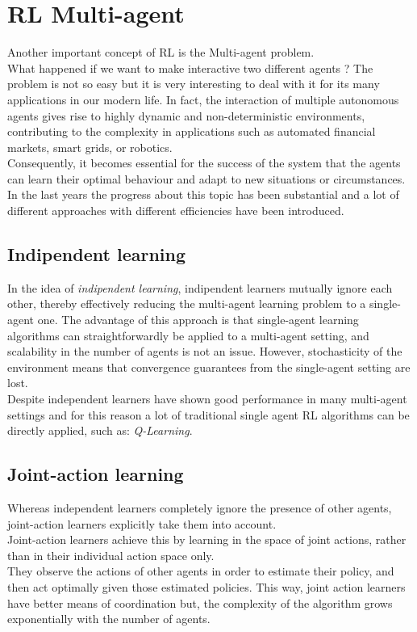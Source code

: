 \documentclass[]{report}
\begin{document}
\section{ RL Multi-agent }
Another important concept of RL is the Multi-agent problem.\\
What happened if we want to make interactive two different agents ? The problem is not so easy but it is very interesting to deal with it for its many applications in our modern life.
In fact, the interaction of multiple autonomous agents gives rise to highly dynamic and non-deterministic environments, contributing to the complexity in applications such as automated financial markets, smart grids, or robotics.\\
Consequently, it becomes essential for the success of the system that the agents can learn their optimal behaviour and adapt to new situations or circumstances.\\
In the last years the progress about this topic has been substantial and a lot of different approaches with different efficiencies have been introduced.

\subsection{Indipendent learning}
In the idea of \emph{indipendent learning}, indipendent learners mutually  ignore  each  other, thereby  effectively reducing  the  multi-agent learning problem to a single-agent one.
The advantage of this approach is that single-agent learning algorithms can straightforwardly be applied to a multi-agent setting, and scalability in the number of agents is not an issue.
However, stochasticity of the environment means that convergence guarantees from the single-agent setting are lost.\\
Despite independent learners have shown good performance in many multi-agent settings and for this reason a lot of traditional single agent RL algorithms can be directly applied, such as: \emph{Q-Learning}.

\subsection{Joint-action learning}
Whereas independent learners completely ignore the presence of other agents, joint-action learners explicitly take them into account.\\ Joint-action learners achieve this by learning in the space of joint actions, rather than in their individual action space only.\\
They observe the actions of other agents in order to estimate their policy, and then act optimally given those estimated policies. This way, joint action learners have better means of coordination but, the complexity of the algorithm grows exponentially with the number of agents. 
\end{document}
